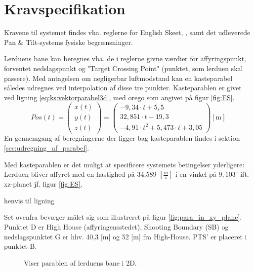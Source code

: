 \section{Kravspecifikation}
\label{sec:kravspecifikation}
Kravene til systemet findes vha. reglerne for English Skeet, \citep{ES_regler},
samt det udleverede Pan \& Tilt-systems fysiske begrænsninger.


Lerduens bane kan beregnes vha. de i reglerne givne værdier for affyringspunkt, forventet nedslagspunkt
og "Target Crossing Point" (punktet, som lerduen skal passere).
Med antagelsen om negligerbar luftmodstand kan en kasteparabel således udregnes ved interpolation af disse tre punkter.
Kasteparablen er givet ved ligning \ref{eq:ks:vektorparabel3d}, med orego som angivet på figur \ref{fig:ES}.
\begin{equation}
Pos\left( t \right) = 
\left( \begin{matrix} 
	x\left( t \right)  \\ 
	y\left( t \right)  \\ 
	z\left( t \right)  \end{matrix} \right) =
	 \left( \begin{matrix} 
	- 9,34\cdot t+5,5 \\
  32,851\cdot t-19,3 \\ 
 -{ 4,91\cdot t }^{ 2 }+5,473\cdot t+3,05\end{matrix} \right) [\text{m}]
\label{eq:ks:vektorparabel3d}
\end{equation}
En gennemgang af beregningerne der ligger bag kasteparablen findes i sektion \ref{sec:udregning_af_parabel}.

Med kasteparablen er det muligt at specificere systemets betingelser yderligere:
Lerduen bliver affyret med en hastighed på 34,589 \([\frac{m}{s}]\) i en vinkel på \(9,103^{\circ}\) ift. xz-planet jf. figur \ref{fig:ES}.





henvis til ligning


Set ovenfra bevæger målet sig som illustreret på figur \ref{fig:para_in_xy_plane}. Punktet D er High House (affyringensstedet), Shooting Boundary (SB) og nedslagspunktet G er hhv. 40,3 [m] og 52 [m] fra High-House. PTS' er placeret i punktet B.\\
\begin{figure}[h!]
\centering
{}
\caption[Lerduens parabel i 2D]{Viser parablen af lerduens bane i 2D.}
\end{figure}

